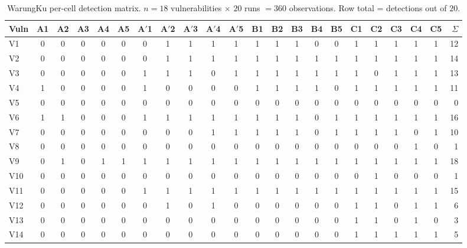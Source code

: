 \documentclass[conference]{IEEEtran}
\begin{document}
\begin{table}[t]
\centering
\caption{WarungKu per-cell detection matrix. $n = 18$ vulnerabilities $\times$ $20$ runs $= 360$ observations. Row total = detections out of $20$.}
\label{tab:wk-matrix}
\scriptsize
\setlength{\tabcolsep}{3pt}
\begin{tabular}{l|ccccc|ccccc|ccccc|ccccc|r}
\toprule
\textbf{Vuln} & \textbf{A1} & \textbf{A2} & \textbf{A3} & \textbf{A4} & \textbf{A5} & \textbf{A$'$1} & \textbf{A$'$2} & \textbf{A$'$3} & \textbf{A$'$4} & \textbf{A$'$5} & \textbf{B1} & \textbf{B2} & \textbf{B3} & \textbf{B4} & \textbf{B5} & \textbf{C1} & \textbf{C2} & \textbf{C3} & \textbf{C4} & \textbf{C5} & \textbf{$\Sigma$} \\
\midrule
V1  & 0 & 0 & 0 & 0 & 0 & 0 & 1 & 1 & 1 & 1 & 1 & 1 & 1 & 0 & 0 & 1 & 1 & 1 & 1 & 1 & 12 \\
V2  & 0 & 0 & 0 & 0 & 0 & 0 & 1 & 1 & 1 & 1 & 1 & 1 & 1 & 1 & 1 & 1 & 1 & 1 & 1 & 1 & 14 \\
V3  & 0 & 0 & 0 & 0 & 0 & 1 & 1 & 1 & 0 & 1 & 1 & 1 & 1 & 1 & 1 & 1 & 0 & 1 & 1 & 1 & 13 \\
V4  & 1 & 0 & 0 & 0 & 0 & 1 & 0 & 0 & 0 & 0 & 1 & 1 & 1 & 1 & 0 & 1 & 1 & 1 & 1 & 1 & 11 \\
V5  & 0 & 0 & 0 & 0 & 0 & 0 & 0 & 0 & 0 & 0 & 0 & 0 & 0 & 0 & 0 & 0 & 0 & 0 & 0 & 0 &  0 \\
V6  & 1 & 1 & 0 & 0 & 0 & 1 & 1 & 1 & 1 & 1 & 1 & 1 & 1 & 0 & 1 & 1 & 1 & 1 & 1 & 1 & 16 \\
V7  & 0 & 0 & 0 & 0 & 0 & 0 & 0 & 0 & 1 & 1 & 1 & 1 & 1 & 0 & 1 & 1 & 1 & 1 & 0 & 1 & 10 \\
V8  & 0 & 0 & 0 & 0 & 0 & 0 & 0 & 0 & 0 & 0 & 0 & 0 & 0 & 0 & 0 & 0 & 0 & 0 & 1 & 0 &  1 \\
V9  & 0 & 1 & 0 & 1 & 1 & 1 & 1 & 1 & 1 & 1 & 1 & 1 & 1 & 1 & 1 & 1 & 1 & 1 & 1 & 1 & 18 \\
V10 & 0 & 0 & 0 & 0 & 0 & 0 & 0 & 0 & 0 & 0 & 0 & 0 & 0 & 0 & 0 & 0 & 1 & 0 & 0 & 0 &  1 \\
V11 & 0 & 0 & 0 & 0 & 0 & 1 & 1 & 1 & 1 & 1 & 1 & 1 & 1 & 1 & 1 & 1 & 1 & 1 & 1 & 1 & 15 \\
V12 & 0 & 0 & 0 & 0 & 0 & 0 & 1 & 0 & 1 & 0 & 0 & 0 & 0 & 0 & 0 & 1 & 1 & 0 & 1 & 1 &  6 \\
V13 & 0 & 0 & 0 & 0 & 0 & 0 & 0 & 0 & 0 & 0 & 0 & 0 & 0 & 0 & 0 & 1 & 1 & 0 & 1 & 0 &  3 \\
V14 & 0 & 0 & 0 & 0 & 0 & 0 & 0 & 0 & 0 & 0 & 0 & 0 & 0 & 0 & 0 & 1 & 1 & 1 & 1 & 1 &  5 \\

\end{tabular}
\end{table}
\end{document}
